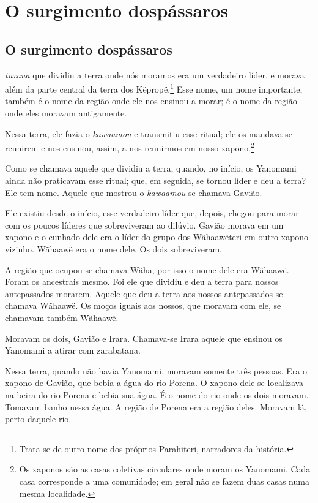 \part[O surgimento dos pássaros]{O surgimento dos\break pássaros}

\chapter[O surgimento dos pássaros]{O surgimento dos\break pássaros}
 
 \textit{tuxaua} que dividiu a terra onde nós moramos era um verdadeiro
líder, e morava além da parte central da terra dos
Këpropë.\footnote{Trata-se de outro nome dos próprios Parahiteri, narradores da história.} Esse nome, um nome importante, também é o nome
da região onde ele nos ensinou a morar; é o nome da região onde eles
moravam antigamente.

Nessa terra, ele fazia o \textit{kawaamou} e transmitiu esse ritual; ele os
mandava se reunirem e nos ensinou, assim, a nos
reunirmos em nosso xapono.\footnote{Os xaponos são as casas coletivas circulares onde moram os Yanomami. Cada casa corresponde a uma comunidade; em geral não se fazem duas casas numa mesma localidade.} 

Como se chamava aquele que dividiu a terra, quando, no início, os
Yanomami ainda não praticavam esse ritual; que, em seguida, se tornou
líder e deu a terra? Ele tem nome. Aquele que mostrou
o \textit{kawaamou} se chamava Gavião.

Ele existiu desde o início, esse verdadeiro líder que, depois, chegou
para morar com os poucos líderes que sobreviveram ao dilúvio. Gavião
morava em um xapono e o cunhado dele era o líder do grupo dos
Wãhaawëteri em outro xapono vizinho. Wãhaawë era o nome
dele. Os dois sobreviveram.

A região que ocupou se chamava Wãha, por isso o nome dele era
Wãhaawë. Foram os ancestrais mesmo. Foi ele que dividiu e deu a terra
para nossos antepassados morarem. Aquele que deu a terra aos nossos
antepassados se chamava Wãhaawë. Os moços iguais aos nossos, que moravam
com ele, se chamavam também Wãhaawë. 

Moravam os dois, Gavião e Irara. Chamava-se Irara aquele que ensinou os
Yanomami a atirar com zarabatana.

Nessa terra, quando não havia Yanomami, moravam somente três pessoas.
Era o xapono de Gavião, que bebia a água do rio Porena. O xapono dele se
localizava na beira do rio Porena e bebia sua água. É o nome do rio onde
os dois moravam. Tomavam banho nessa água. A região de Porena era a região
deles. Moravam lá, perto daquele rio. 

